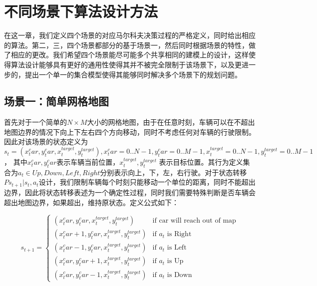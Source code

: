 \documentclass{standalone}
\begin{document}
\section{不同场景下算法设计方法}
在这一章，我们定义四个场景的对应马尔科夫决策过程的严格定义，同时给出相应的算法。第二，三，四个场景都部分的基于场景一，然后同时根据场景的特性，做了相应的更改。我们希望四个场景能尽可能多个共享相同的建模上的设计，这样使得算法设计能够具有更好的通用性使得其并不被完全限制于该场景下，以及更进一步的，提出一个单一的集合模型使得其能够同时解决多个场景下的规划问题。
\subsection{场景一：简单网格地图}
首先对于一个简单的$N \times M$大小的网格地图，由于在任意时刻，车辆可以在不超出地图边界的情况下向上下左右四个方向移动，同时不考虑任何对车辆的行驶限制。因此对该场景的状态定义为$s_t = (x_t^car, y_t^car, x^{target}_t, y^{target}_t), x_t^car=0..N-1, y_t^car=0..M-1, x^{target}_t=0..N-1, y^{target}_t=0..M-1$， 其中$x_t^car, y_t^car$表示车辆当前位置，$x^{target}_t, y^{target}_t$ 表示目标位置。其行为定义集合为$a_t \in {Up, Down, Left, Right}$分别表示向上，下，左，右行驶。对于状态转移$P{s_{t+1}|s_t, a_t}$设计，我们限制车辆每个时刻只能移动一个单位的距离，同时不能超出边界，因此将状态转移表述为一个确定性过程，同时我们需要特殊判断是否车辆会超出地图边界，如果超出，维持原状态。定义公式如下：
\begin{center}
    \begin{equation}
    s_{t+1} = \begin{cases}
    (x_t^car, y_t^car, x^{target}_t, y^{target}_t) &\mbox{if car will reach out of map}\\
    (x_t^car + 1, y_t^car, x^{target}_t, y^{target}_t) &\mbox{if $a_t$ is Right}\\
    (x_t^car - 1, y_t^car, x^{target}_t, y^{target}_t) &\mbox{if $a_t$ is Left}\\
    (x_t^car, y_t^car + 1, x^{target}_t, y^{target}_t) &\mbox{if $a_t$ is Up}\\
    (x_t^car, y_t^car - 1, x^{target}_t, y^{target}_t) &\mbox{if $a_t$ is Down}
    \end{cases}
\end{equation}
\end{center}
\end{document}
